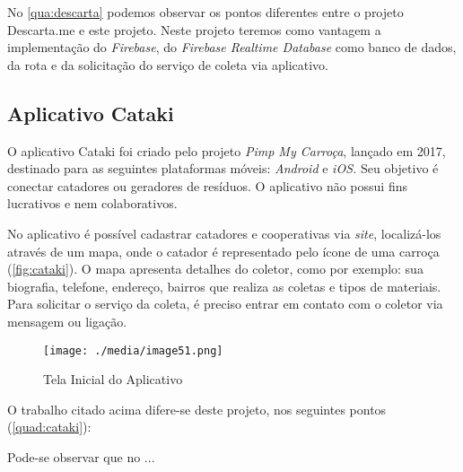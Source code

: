 No \autoref{qua:descarta} podemos observar os pontos diferentes entre o projeto Descarta.me e este projeto. Neste projeto teremos como vantagem a implementação do \textit{Firebase}, do \textit{Firebase Realtime Database} como banco de dados, da rota e da solicitação do serviço de coleta via aplicativo.

\subsection{Aplicativo Cataki}

 O aplicativo Cataki foi criado pelo projeto \textit{Pimp My Carroça}, lançado em 2017, destinado para as seguintes plataformas móveis: \textit{Android }e \textit{iOS. }Seu objetivo é conectar catadores ou geradores de resíduos. O aplicativo não possui fins lucrativos e nem colaborativos. 

 No aplicativo é possível cadastrar catadores e cooperativas via \textit{site}, localizá-los através de um mapa, onde o catador é representado pelo ícone de uma carroça (\autoref{fig:cataki}). O mapa apresenta detalhes do coletor, como por exemplo: sua biografia, telefone, endereço, bairros que realiza as coletas e tipos de materiais. Para solicitar o serviço da coleta, é preciso entrar em contato com o coletor via mensagem ou ligação.





\begin{figure}[H]
	\begin{Center}
		\texttt{[image: ./media/image51.png]}
	\end{Center}
	\caption{Tela Inicial do Aplicativo}
	\label{fig:cataki}
	\end{figure}


 O trabalho citado acima difere-se deste projeto, nos seguintes pontos (\autoref{quad:cataki}):


Pode-se observar que no ...
